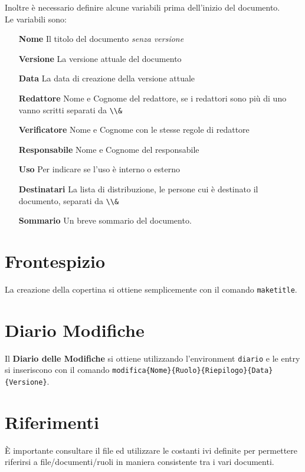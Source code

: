 \documentclass[a4paper,titlepage]{article}
\begin{document}
Inoltre è necessario definire alcune variabili prima dell'inizio del documento.\\
Le variabili sono:
\begin{itemize}
  \item[\textbf{Nome}] Il titolo del documento \textit{senza versione}
  \item[\textbf{Versione}] La versione attuale del documento
  \item[\textbf{Data}] La data di creazione della versione attuale
  \item[\textbf{Redattore}] Nome e Cognome del redattore, se i redattori sono più di uno vanno scritti separati da \texttt{\textbackslash \textbackslash \&}
  \item[\textbf{Verificatore}] Nome e Cognome con le stesse regole di redattore
  \item[\textbf{Responsabile}] Nome e Cognome del responsabile
  \item[\textbf{Uso}] Per indicare se l'uso è interno o esterno
  \item[\textbf{Destinatari}] La lista di distribuzione, le persone cui è destinato il documento, separati da \texttt{\textbackslash \textbackslash \&}
  \item[\textbf{Sommario}] Un breve sommario del documento.
\end{itemize}

\section{Frontespizio}
\label{sec:Frontespizio}

La creazione della copertina si ottiene semplicemente con il comando \texttt{maketitle}.

\section{Diario Modifiche}
\label{sec:DiarioModifiche}

Il \textbf{Diario delle Modifiche} si ottiene utilizzando l'environment \texttt{diario} e le entry si inseriscono con il comando \texttt{modifica\{Nome\}\{Ruolo\}\{Riepilogo\}\{Data\}\{Versione\}}.

\section{Riferimenti}
\label{sec:Riferimenti}

È importante consultare il file  ed utilizzare le costanti ivi definite per permettere riferirsi a file/documenti/ruoli in maniera consistente tra i vari documenti.
\end{document}
